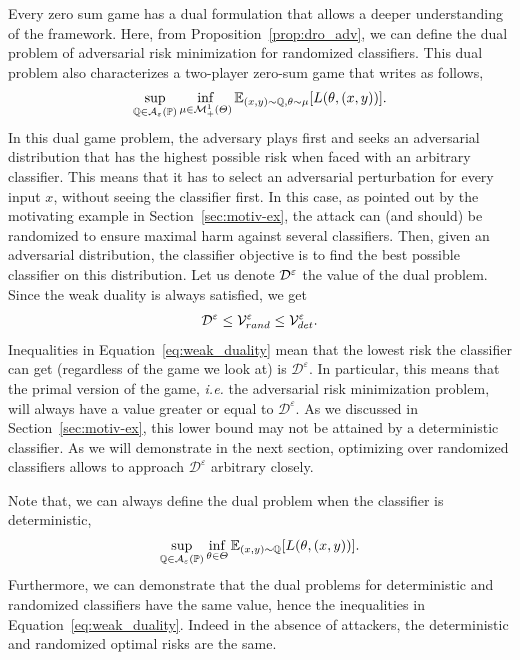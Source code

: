 Every zero sum game has a dual formulation that allows a deeper understanding of the framework. Here, from Proposition~\ref{prop:dro_adv}, we can define the dual problem of adversarial risk minimization for randomized classifiers. This dual problem also characterizes a two-player zero-sum game that writes as follows,
\begin{align}
    \sup_{\QQ\in\mathcal{A}_{\varepsilon}(\PP)}\inf_{\mu\in\mathcal{M}^1_+(\Theta)}\mathbb{E}_{(x,y)\sim\QQ,\theta\sim\mu}\left[\loss(\theta,(x,y))\right].
\label{eq:dual_pb}
\end{align}
In this dual game problem, the adversary plays first and seeks an adversarial distribution that has the highest possible risk when faced with an arbitrary classifier. This means that it has to select an adversarial perturbation for every input $x$, without seeing the classifier first. In this case, as pointed out by the motivating example in Section~\ref{sec:motiv-ex}, the attack can (and should) be randomized to ensure maximal harm against several classifiers. Then, given an adversarial distribution, the classifier objective is to find the best possible classifier on this distribution. Let us denote $\mathcal{D}^\varepsilon$ the value of the dual problem. Since the weak duality is always satisfied, we get
\begin{align}
\label{eq:weak_duality}
\mathcal{D}^\varepsilon\leq \mathcal{V}_{rand}^\varepsilon\leq \mathcal{V}_{det}^\varepsilon.
\end{align}
Inequalities in Equation~\eqref{eq:weak_duality} mean that the lowest risk the classifier can get (regardless of the game we look at) is $\mathcal{D}^\varepsilon$. In particular, this means that the primal version of the game, \emph{i.e.} the adversarial risk minimization problem, will always have a value greater or equal to $\mathcal{D}^\varepsilon$. As we discussed in Section~\ref{sec:motiv-ex}, this lower bound may not be attained by a deterministic classifier. As we will demonstrate in the next section, optimizing over randomized classifiers allows to approach $\mathcal{D}^\varepsilon$ arbitrary closely.

Note that, we can always define the dual problem when the classifier is deterministic, \begin{align*}
    \sup_{\QQ\in\mathcal{A}_{\varepsilon}(\PP)}\inf_{\theta\in\Theta}\mathbb{E}_{(x,y)\sim\QQ}\left[\loss(\theta,(x,y))\right].
\end{align*}
Furthermore, we can demonstrate that the dual problems for deterministic and randomized classifiers have the same value, hence the inequalities in Equation~\eqref{eq:weak_duality}. Indeed in the absence of attackers, the deterministic and randomized optimal risks are the same.

